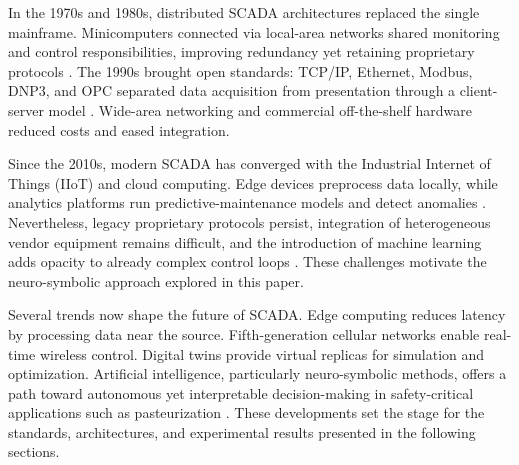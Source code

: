 In the 1970s and 1980s, distributed SCADA architectures replaced the single
mainframe. Minicomputers connected via local-area networks shared monitoring and
control responsibilities, improving redundancy yet retaining proprietary
protocols \cite{MFGTechHub2024}. The 1990s brought open standards: TCP/IP,
Ethernet, Modbus, DNP3, and OPC separated data acquisition from presentation
through a client-server model \cite{TechTarget2024}. Wide-area networking and
commercial off-the-shelf hardware reduced costs and eased integration.

Since the 2010s, modern SCADA has converged with the Industrial Internet of
Things (IIoT) and cloud computing. Edge devices preprocess data locally, while
analytics platforms run predictive-maintenance models and detect anomalies
\cite{Nechibvute2024}. Nevertheless, legacy proprietary protocols persist,
integration of heterogeneous vendor equipment remains difficult, and the
introduction of machine learning adds opacity to already complex control loops
\cite{Heidari2025}. These challenges motivate the neuro-symbolic approach
explored in this paper.

Several trends now shape the future of SCADA. Edge computing reduces latency by
processing data near the source. Fifth-generation cellular networks enable
real-time wireless control. Digital twins provide virtual replicas for
simulation and optimization. Artificial intelligence, particularly
neuro-symbolic methods, offers a path toward autonomous yet interpretable
decision-making in safety-critical applications such as pasteurization
\cite{Heidari2025}. These developments set the stage for the standards,
architectures, and experimental results presented in the following sections.

